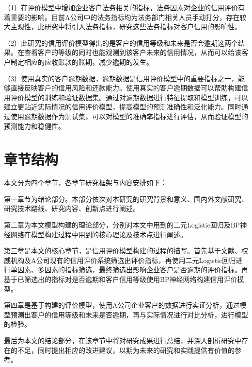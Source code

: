 （1）在评价模型中增加企业客户法务相关的指标，法务因素对企业的信用评价有着重要的影响。目前A公司中的法务指标均为法务部门相关人员手动打分，存在较大主观性，此研究中将引入法务指标，研究这些法务指标对客户信用的影响性。

（2）此研究的信用评价模型得出的是客户的信用等级和未来是否会逾期这两个结果。在查看客户的等级的同时也能观测到该客户未来的信用情况，从而可以给该客户制定相应的应收账款的账期，减少逾期的发生。

（3）使用真实的客户逾期数据，逾期数据是信用评价模型中的重要指标之一，能够直接反映客户的信用风险和还款能力。使用真实的客户逾期数据可以帮助构建信用评价模型的训练和验证数据集。通过对逾期数据进行特征提取和模型训练，可以建立更贴近实际情况的信用评价模型，提高模型的预测准确性和泛化能力。同时通过使用逾期数据作为测试集，可以对模型的准确率指标进行评估，从而验证模型的预测能力和稳健性。

\section{章节结构}
本文分为四个章节，各章节研究框架与内容安排如下：

第一章节为绪论部分。本部分依次对本研究的研究背景和意义、国内外文献研究、研究技术路线、研究内容、创新点进行阐述。

第二章为本文模型构建的理论部分，分别对本文中用到的二元Logistic回归及BP神经网络在模型构建过程中用到的核心理论及技术点进行阐述。

第三章是本文的核心章节，是信用评价模型构建的过程的描写。首先基于文献、权威机构及A公司现有的信用评价系统筛选出评价指标，再使用二元Logistic回归进行单因素、多因素的指标筛选，最终筛选出影响企业客户是否逾期的评价指标。再基于已筛选出的指标对是否逾期和客户信用等级使用BP神经网络构建信用评价模型。

第四章是基于构建的评价模型，使用A公司企业客户的数据进行实证分析，通过模型预测出客户的信用等级和未来是否逾期，再与实际情况进行对比分析，进行模型的检验。

最后为本文的结论部分，在该章节中将对研究成果进行总结，并深入剖析研究中存在的不足，同时提出相应的改进建议，以期为未来的研究和实践提供有价值的参考。